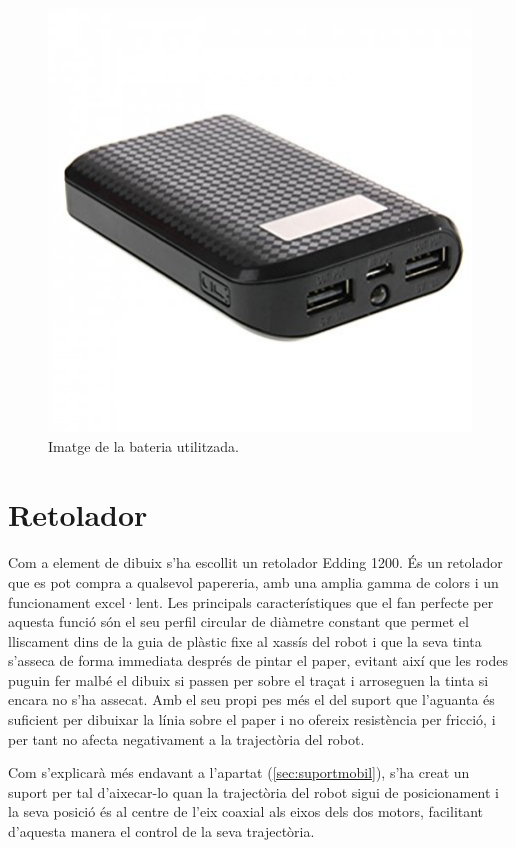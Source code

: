 \begin{figure}[H]
	\centering
	\includegraphics[scale=0.4]{bateria.png}
	\caption{Imatge de la bateria utilitzada.}
	\label{fig:bateria}
\end{figure}

\section{Retolador} \label{sec:retolador}

Com a element de dibuix s’ha escollit un retolador Edding 1200. És un retolador que es pot compra a qualsevol papereria, amb una amplia gamma de colors i un funcionament excel·lent. Les principals característiques que el fan perfecte per aquesta funció són el seu perfil circular de diàmetre constant que permet el lliscament dins de la guia de plàstic fixe al xassís del robot i que la seva tinta s’asseca de forma immediata després de pintar el paper, evitant així que les rodes puguin fer malbé el dibuix si passen per sobre el traçat i arroseguen la tinta si encara no s'ha assecat. Amb el seu propi pes més el del suport que l'aguanta és suficient per dibuixar la línia sobre el paper i no ofereix resistència per fricció, i per tant no afecta negativament a la trajectòria del robot. 

Com s’explicarà més endavant a l'apartat (\ref{sec:suportmobil}), s’ha creat un suport per tal d’aixecar-lo quan la trajectòria del robot sigui de posicionament i la seva posició és al centre de l’eix coaxial als eixos dels dos motors, facilitant d’aquesta manera el control de la seva trajectòria. 

